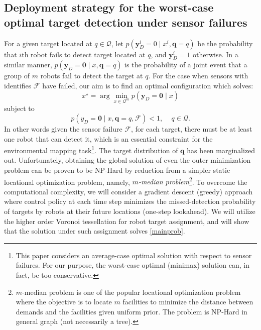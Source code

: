 \documentclass[letterpaper, 10 pt, conference]{ieeeconf}
\begin{document}
\subsection{Deployment strategy for the worst-case optimal target detection under sensor failures}
\label{sec:sec23}
For a given target located at $q \in \mathcal{Q}$, let $
p(\bm{y}_{D}^i =0 \mid x^i,\bm{q} = q)
$
be the probability that $i$th robot fails to detect target located at $q$, and $\bm{y}_{D}^i = 1$ otherwise.
In a similar manner, $p(\bm{y}_{D}=\bm{0} \mid x, \bm{q}=q)$ is the probability of a joint event that a group of $m$ robots fail to detect the target at $q$. 
For the case when sensors with identifies $\mathcal{F}$ have failed, our aim is to find an optimal configuration which solves:
\begin{equation}
x^{\star} = \arg
\min_{x \in \mathcal{Q}^m} 
p(\bm{y}_{D} = \bm{0} \mid x)
\label{mainprob}
\end{equation}
subject to
\begin{equation}
p(y_D = \bm{0} \mid x,\bm{q}=q,\mathcal{F}) <1, \,\,\,\,\,\,\, q \in \mathcal{Q}.
\label{const}
\end{equation}
In other words given the sensor failure $\mathcal{F}$, for each target, there must be at least one robot that can detect it, which is an essential constraint for the environmental mapping task\footnote{This paper considers an average-case optimal solution with respect to sensor failures. For our purpose, the worst-case optimal (minimax) solution can, in fact, be too conservative.}.
The target distribution of $\bm{q}$ has been marginalized out. Unfortunately, obtaining the global solution of even the outer minimization problem can be proven to be NP-Hard by reduction from a simpler static locational optimization problem, namely, \emph{$m$-median problem}\footnote{$m$-median problem is one of the popular locational optimization problem where the objective is to locate $m$ facilities to minimize the distance between demands and the facilities given uniform prior. The problem is NP-Hard in general graph (not necessarily a tree).}. To overcome the computational complexity, we will consider a gradient descent (greedy) approach where control policy at each time step minimizes the missed-detection probability of targets by robots at their future locations (one-step lookahead). We will utilize the higher order Voronoi tessellation \cite{shamos1975closest} for robot target assignment, and will show that the solution under such assignment solves \eqref{mainprob}.
\end{document}
